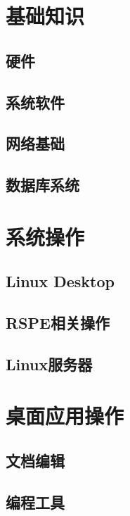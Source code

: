 \documentclass[winfonts]{ctexrep}
\title{\sffamily \bookname}
\author{李明哲}
\date{\today}
\begin{document}
\maketitle
{}
\tableofcontents
\listoffigures
\listoftables

\part{基础知识}
\chapter{硬件}

\chapter{系统软件}

\chapter{网络基础}

\chapter{数据库系统}


\part{系统操作}
\chapter{Linux Desktop}

\chapter{RSPE相关操作}

\chapter{Linux服务器}


\part{桌面应用操作}

\chapter{文档编辑}

\chapter{编程工具}

\end{document}
